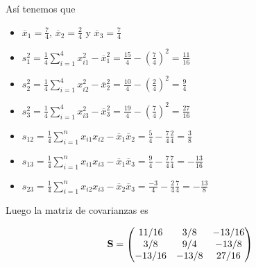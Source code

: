 \begin{frame}
Así tenemos que 

\begin{itemize}
\item $\overline{x}_1= \frac{7}{4}$, $\overline{x}_2= \frac{2}{4}$ y $\overline{x}_3= \frac{7}{4}$

\item $s_1^2=\frac{1}{4}\sum_{i=1}^4 x_{i 1}^2-\overline{x}_1^2=\frac{15}{4} -\left( \frac{7}{4}\right)^2=\frac{11}{16}$

\item  
$s_2^2=\frac{1}{4}\sum_{i=1}^4 x_{i 2}^2-\overline{x}_2^2=\frac{10}{4} -\left( \frac{2}{4}\right)^2=\frac{9}{4}$

\item $s_3^2=\frac{1}{4}\sum_{i=1}^4 x_{i 3}^2-\overline{x}_3^2=\frac{19}{4} -\left( \frac{7}{4}\right)^2=\frac{27}{16}$

\item  $s_{1 2}=\frac{1}{4}\sum_{i=1}^n x_{i 1} x_{i 2} -\overline{x}_1 \overline{x}_2=  \frac{5}{4}-\frac{7}{4} \frac{2}{4}=\frac{3}{8}$
\item $s_{1 3}=\frac{1}{4}\sum_{i=1}^n x_{i 1} x_{i 3} -\overline{x}_1 \overline{x}_3=  \frac{9}{4}-\frac{7}{4} \frac{7}{4}=-\frac{13}{16}$
\item $s_{2 3}=\frac{1}{4}\sum_{i=1}^n x_{i 2} x_{i 3} -\overline{x}_2 \overline{x}_3=  \frac{-3}{4}-\frac{2}{4} \frac{7}{4}=-\frac{13}{8}$
\end{itemize}

Luego la matriz de covarianzas es 

$$\mathbf{S}= \begin{pmatrix}
 {11}/{16} & {3}/{8}& -{13}/{16} \\
{3}/{8} & {9}/{4}  & -{13}/{8}\\
   -{13}/{16} & -{13}/{8}&  {27}/{16}
 \end{pmatrix}$$

\end{frame}

